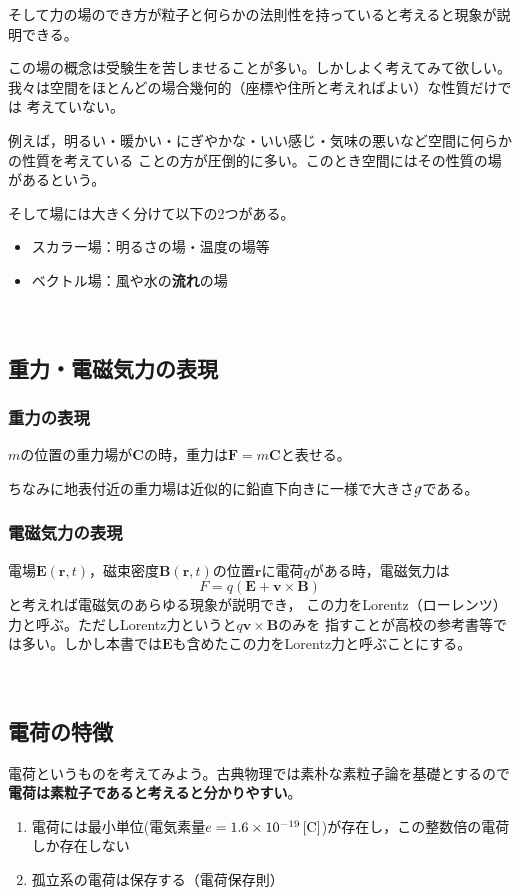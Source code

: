 そして力の場のでき方が粒子と何らかの法則性を持っていると考えると現象が説明できる。

この場の概念は受験生を苦しませることが多い。しかしよく考えてみて欲しい。
我々は空間をほとんどの場合幾何的（座標や住所と考えればよい）な性質だけでは
考えていない。

例えば，明るい・暖かい・にぎやかな・いい感じ・気味の悪いなど空間に何らかの性質を考えている
ことの方が圧倒的に多い。このとき空間にはその性質の場があるという。

そして場には大きく分けて以下の2つがある。

\begin{itemize}
\item スカラー場：明るさの場・温度の場等
\item ベクトル場：風や水の{\bfseries 流れ}の場
\end{itemize}

﻿\subsection{重力・電磁気力の表現}

\subsubsection{重力の表現}

$m$の位置の重力場が$\bm C$の時，重力は$\bm{F} =m\bm{C}$と表せる。

ちなみに地表付近の重力場は近似的に鉛直下向きに一様で大きさ$\varg$である。

\subsubsection{電磁気力の表現}

電場$\bm E (\bm r,t)$，磁束密度$\bm B (\bm r,t)$の位置$\bm r$に電荷$q$がある時，電磁気力は
\[\bm{}F=q(\bm{E} +\bm{v}\times \bm{B})\]
と考えれば電磁気のあらゆる現象が説明でき，
この力をLorentz（ローレンツ）力と呼ぶ。ただしLorentz力というと$q\bm v\times \bm B$のみを
指すことが高校の参考書等では多い。しかし本書では$\bm E$も含めたこの力をLorentz力と呼ぶことにする。

﻿\subsection{電荷の特徴}

電荷というものを考えてみよう。古典物理では素朴な素粒子論を基礎とするので
{\bfseries 電荷は素粒子であると考えると分かりやすい}。
\begin{enumerate}
\item 電荷には最小単位(電気素量$e=1.6\times 10^{-19}\unit C$)が存在し，この整数倍の電荷しか存在しない
\item 孤立系の電荷は保存する（電荷保存則）
\end{enumerate}

